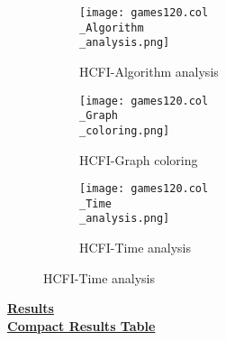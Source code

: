 \documentclass[10pt]{article}
\begin{document}
\graphicspath{{./Core1/Solutions/HCFI/games120.col}}
\begin{figure}[H]
\begin{subfigure}{.33\textwidth}
  \centering
  \texttt{[image: games120.col\\\_Algorithm\\\_analysis.png]}
  \caption{HCFI-Algorithm analysis}
   \label{fig:subfig1}
\end{subfigure}%
\begin{subfigure}{.33\textwidth}
  \centering
  \texttt{[image: games120.col\\\_Graph\\\_coloring.png]}
  \caption{HCFI-Graph coloring}
  \label{fig:subfig2}
\end{subfigure}
\begin{subfigure}{.33\textwidth}
  \centering
  \texttt{[image: games120.col\\\_Time\\\_analysis.png]}
  \caption{HCFI-Time analysis}
  \end{subfigure}
\end{figure}
\vspace{2cm}
\begin{center}
\hyperlink{page.8}{\textbf{Results}}\\
\vspace{0.5cm}
\hyperlink{page.71}{\textbf{Compact Results Table}}
\end{center}
\pagebreak
\end{document}
